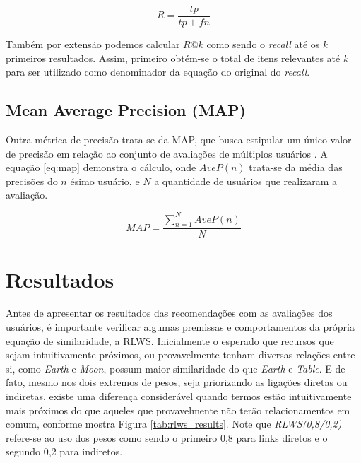 \begin{equation}
	R = \frac{tp}{tp + fn}
\label{eq:recall}
\end{equation}

Também por extensão podemos calcular $R@k$ como sendo o \textit{recall} até os $k$ primeiros resultados. Assim, primeiro obtém-se o total de itens relevantes até $k$ para ser utilizado como denominador da equação do original do \textit{recall}.

\subsection{Mean Average Precision (MAP)}

Outra métrica de precisão trata-se da \ac{MAP}, que busca estipular um único valor de precisão em relação ao conjunto de avaliações de múltiplos usuários \citep{Manning:2008}. A equação \ref{eq:map} demonstra o cálculo, onde $AveP(n)$ trata-se da média das precisões do $n$ ésimo usuário, e $N$ a quantidade de usuários que realizaram a avaliação.

\begin{equation}
	MAP = \frac{\sum_{n=1}^{N}AveP(n)}{N}
\label{eq:map}
\end{equation}

\section{Resultados}

Antes de apresentar os resultados das recomendações com as avaliações dos usuários, é importante verificar algumas premissas e comportamentos da própria equação de similaridade, a \ac{RLWS}. Inicialmente o esperado que recursos que sejam intuitivamente próximos, ou provavelmente tenham diversas relações entre si,  como \textit{Earth} e \textit{Moon}, possum maior similaridade do que \textit{Earth} e \textit{Table}. E de fato, mesmo nos dois extremos de pesos, seja priorizando as ligações diretas ou indiretas, existe uma diferença considerável quando termos estão intuitivamente mais próximos do que aqueles que provavelmente não terão relacionamentos em comum, conforme mostra Figura \ref{tab:rlws_results}. Note que \textit{RLWS(0,8/0,2)} refere-se ao uso dos pesos como sendo o primeiro 0,8 para links diretos e o segundo 0,2 para indiretos.

